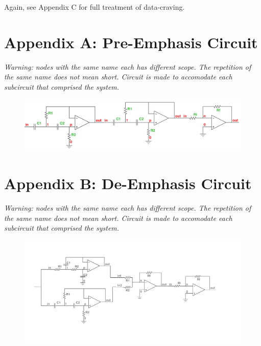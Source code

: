 \documentclass[report]{IEEEtran}
\begin{document}
	Again, see Appendix C for full treatment of data-craving.
		
		\newpage
		\onecolumn
		\section*{Appendix A: Pre-Emphasis Circuit}
		\it{Warning: nodes with the same name each has different scope. The repetition of the same name does not mean short. Circuit is made to accomodate each subcircuit that comprised the system.}
			\begin{figure}[h!]
				\begin{center}
					\includegraphics[width=\textwidth]{preemp.jpg} 
				\end{center}
			\end{figure}
		\section*{Appendix B: De-Emphasis Circuit}
		\it{Warning: nodes with the same name each has different scope. The repetition of the same name does not mean short. Circuit is made to accomodate each subcircuit that comprised the system.}
			\begin{figure}[h!]
				\begin{center}
					\includegraphics[width=\textwidth]{deemp.jpg}
				\end{center}
			\end{figure}
		\newpage
\end{document}
